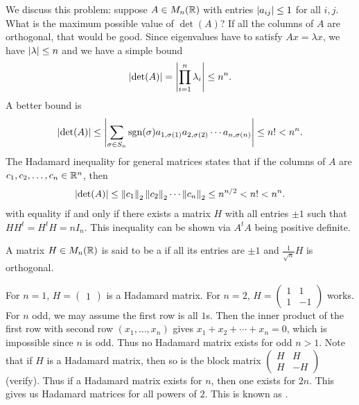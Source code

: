 We discuss this problem: suppose $A \in M_{n}(\mathbb{R})$ with entries $\left| a_{ij} \right| \leq 1$ for all $i,j$. What is the maximum possible value of $\det(A)$? If all the columns of $A$ are orthogonal, that would be good. Since eigenvalues have to satisfy $Ax = \lambda x$, we have $\left| \lambda \right| \leq n$ and we have a simple bound
\begin{align}
    \left| \det(A) \right| = \left| \prod_{i=1}^{n} \lambda_{i} \right| \leq n^{n}.
\end{align}
A better bound is
\begin{align}
    \left| \det(A) \right| \leq \left| \sum_{\sigma \in S_{n}} \mathrm{sgn}(\sigma) a_{1,\sigma(1)} a_{2,\sigma(2)} \cdots a_{n,\sigma(n)} \right| \leq n! < n^{n}.
\end{align}
The Hadamard inequality for general matrices states that if the columns of $A$ are $c_{1},c_{2},\ldots,c_{n} \in \mathbb{R}^{n}$, then
\begin{align}
    \left| \det(A) \right| \leq \left\lVert c_{1}\right\rVert_{2} \left\lVert c_{2}\right\rVert_{2} \cdots \left\lVert c_{n}\right\rVert_{2} \leq n^{n/2} < n! < n^{n}.
\end{align}
with equality if and only if there exists a matrix $H$ with all entries $\pm 1$ such that $HH^{t} = H^{t} H = nI_{n}$. This inequality can be shown via $A^{t}A$ being positive definite.

\begin{definition}
    A matrix $H \in M_{n}(\mathbb{R})$ is said to be a  if all its entries are $\pm 1$ and $\frac{1}{\sqrt{n}} H$ is orthogonal.
\end{definition}

For $n = 1$, $H = \begin{pmatrix}
    1
\end{pmatrix}$ is a Hadamard matrix. For $n = 2$, $H = \begin{pmatrix}
    1 & 1 \\
    1 & -1
\end{pmatrix}$ works. For $n$ odd, we may assume the first row is all $1$s. Then the inner product of the first row with second row $(x_{1},\ldots,x_{n})$ gives $x_{1} + x_{2} + \cdots + x_{n} = 0$, which is impossible since $n$ is odd. Thus no Hadamard matrix exists for odd $n > 1$. Note that if $H$ is a Hadamard matrix, then so is the block matrix $\begin{pmatrix}
    H & H \\
    H & -H
\end{pmatrix}$ (verify). Thus if a Hadamard matrix exists for $n$, then one exists for $2n$. This gives us Hadamard matrices for all powers of $2$. This is known as . 

